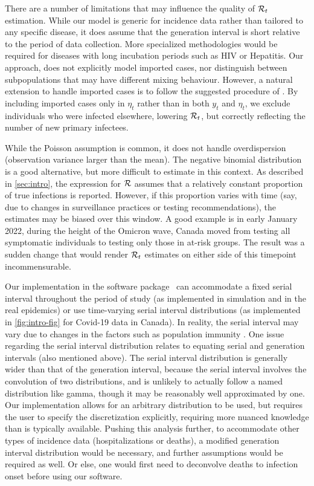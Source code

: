 There are a number of limitations that may influence the quality of $\mathcal{R}_t$
estimation. While our model is generic for incidence data rather than tailored
to any specific disease, it does assume that the generation interval is short
relative to the period of data collection. More specialized methodologies would
be required for diseases with long incubation periods such as HIV or Hepatitis.
Our approach, does not explicitly model imported cases, nor distinguish between
subpopulations that may have different mixing behaviour. However, a natural
extension to handle imported cases is to follow the suggested procedure of
\cite{thompson2019improved}. By including imported cases only in $\eta_t$ rather
than in both $y_t$ and $\eta_t$, we exclude individuals who were infected
elsewhere, lowering $\mathcal{R}_t$, but correctly reflecting the number of new
primary infectees.

While the Poisson assumption is common, it does not handle overdispersion
(observation variance larger than the mean). The negative binomial distribution
is a good alternative, but more difficult to estimate in this context. As
described in \autoref{sec:intro}, the expression for $\mathcal{R}$ assumes that a
relatively constant proportion of true infections is reported. However, if this
proportion varies with time (say, due to changes in surveillance practices or
testing recommendations), the estimates may be biased over this window. A good
example is in early January 2022, during the height of the Omicron wave, Canada
moved from testing all symptomatic individuals to testing only those in at-risk
groups. The result was a sudden change that would render $\mathcal{R}_t$ estimates on
either side of this timepoint incommensurable.


Our implementation in the software package \RtEstim\ can accommodate a fixed
serial interval throughout the period of study (as implemented in simulation and
in the real epidemics) or use time-varying serial interval distributions (as
implemented in \autoref{fig:intro-fig} for Covid-19 data in Canada). In reality,
the serial interval may vary due to changes in the factors such as population
immunity \citep{nash2023estimating}. One issue regarding the serial interval
distribution relates to equating serial and generation intervals (also mentioned
above). The serial interval distribution is generally wider than that of the
generation interval, because the serial interval involves the convolution of two
distributions, and is unlikely to actually follow a named distribution like
gamma, though it may be reasonably well approximated by one. Our implementation
allows for an arbitrary distribution to be used, but requires the user to
specify the discretization explicitly, requiring more nuanced knowledge than is
typically available. Pushing this analysis further, to accommodate other types
of incidence data (hospitalizations or deaths), a modified generation interval
distribution would be necessary, and further assumptions would be required as
well. Or else, one would first need to deconvolve deaths to infection onset
before using our software.



